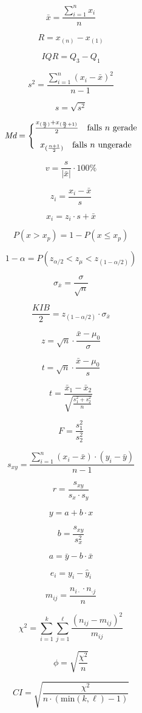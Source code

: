 \documentclass[
  11pt,
  ngerman,
  a4paper,
]{report}
\begin{document}
\begin{multicols}{2}
\scriptsize

$$ \bar{x}=\frac{\sum\limits _{i=1}^{n}x_{i}}{n} $$

$$ R=x_{(n)}-x_{(1)} $$

$$ \mathit{IQR}=Q_3-Q_1 $$

$$ s^2=\dfrac{\displaystyle\sum_{i=1}^{n}(x_{i}-\bar{x})^2}{n-1} $$

$$ s=\sqrt{s^{2}} $$

$$ \def\arraystretch{1.2} \textit{Md} = \Bigg\{\begin{array}{@{}c@{}}\frac{x_{(\frac{n}{2})}+x_{(\frac{n}{2}+1)}}{2} \quad \textrm{falls }n \textrm{ gerade}\\[6pt] x_{(\frac{n+1}{2})}\quad \textrm{falls }n \textrm{ ungerade}\end{array}$$

$$ v=\frac{s}{|\bar{x}|} \cdot 100\%$$

$$ z_i=\frac{x_i-\bar{x}}{s} $$

$$ x_i=z_i\cdot s+\bar{x} $$

$$ P(x>x_p)=1-P(x\leq x_p)$$

$$ 1-\alpha=P(z_{\alpha/2} < z_{\mu} < z_{(1-\alpha/2)}) $$

$$ \sigma_{\bar{x}}=\frac{\sigma}{\sqrt{n}}$$

$$ \frac{\mathit{KIB}}{2} = z_{(1-\alpha/2)} \cdot \sigma_{\bar{x}} $$

$$ z=\sqrt{n}\cdot\frac{\bar{x}-\mu_0}{\sigma}$$

$$ t=\sqrt{n}\cdot\frac{\bar{x}-\mu_0}{s}$$

$$ t=\frac{\bar{x}_{1}-\bar{x}_{2}}{\sqrt{\frac{s_1^2+s^2_2}{n}}} $$

$$ F={\frac{s_{1}^{2}}{s_{2}^{2}}} $$

$$ s_{xy}=\frac{\displaystyle \sum_{i=1}^{n}(x_{i}-\bar{x})\cdot(y_{i}-\bar{y})}{n-1} $$

$$ r=\frac{s_{xy}}{s_x\cdot s_y} $$

$$ y=a + b\cdot x$$

$$ b=\frac{s_{xy}}{s^2_x}$$

$$ a = \bar{y} - b \cdot \bar{x}$$

$$ e_i=y_i-\hat{y}_i $$

$$ m_{ij}=\frac{n_{i\cdot}\cdot n_{\cdot j}}{n} $$

$$ \chi^2= \sum_{i=1}^{k}\sum_{j=1}^{\ell}\frac{(n_{ij}-m_{ij})^{2}}{m_{ij}} $$

$$ \phi=\sqrt{\frac{\chi^2}{n}} $$

$$ \mathit{CI}=\sqrt{\frac{\chi^2}{n \cdot (\mathrm{min}(k, \ell)-1)}}$$

\end{multicols}
\end{document}
